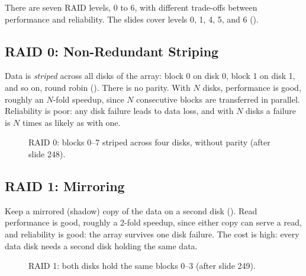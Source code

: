There are seven RAID levels, 0 to 6, with different trade-offs between performance and reliability. The slides cover levels 0, 1, 4, 5, and 6 ().

\subsection{RAID 0: Non-Redundant Striping}

Data is \emph{striped} across all disks of the array: block 0 on disk 0, block 1 on disk 1, and so on, round robin (). There is no parity. With $N$ disks, performance is good, roughly an $N$-fold speedup, since $N$ consecutive blocks are transferred in parallel. Reliability is poor: any disk failure leads to data loss, and with $N$ disks a failure is $N$ times as likely as with one.

\begin{figure}[H]
\centering
{}
\caption{RAID 0: blocks 0--7 striped across four disks, without parity (after slide 248).}
\label{fig:raid}
\end{figure}

\subsection{RAID 1: Mirroring}

Keep a mirrored (shadow) copy of the data on a second disk (). Read performance is good, roughly a 2-fold speedup, since either copy can serve a read, and reliability is good: the array survives one disk failure. The cost is high: every data disk needs a second disk holding the same data.

\begin{figure}[H]
\centering
{}
\caption{RAID 1: both disks hold the same blocks 0--3 (after slide 249).}
\label{fig:raid1}
\end{figure}

